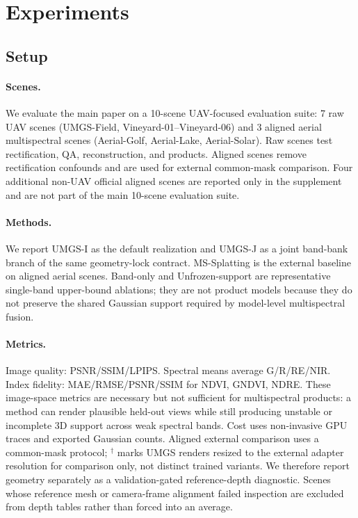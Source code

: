 ﻿\section{Experiments}

\subsection{Setup}

\paragraph{Scenes.}
We evaluate the main paper on a 10-scene UAV-focused evaluation suite: 7 raw UAV scenes (UMGS-Field, Vineyard-01--Vineyard-06) and 3 aligned aerial multispectral scenes (Aerial-Golf, Aerial-Lake, Aerial-Solar). Raw scenes test rectification, QA, reconstruction, and products. Aligned scenes remove rectification confounds and are used for external common-mask comparison. Four additional non-UAV official aligned scenes are reported only in the supplement and are not part of the main 10-scene evaluation suite.

\paragraph{Methods.}
We report UMGS-I as the default realization and UMGS-J as a joint band-bank branch of the same geometry-lock contract. MS-Splatting is the external baseline on aligned aerial scenes. Band-only and Unfrozen-support are representative single-band upper-bound ablations; they are not product models because they do not preserve the shared Gaussian support required by model-level multispectral fusion.

\paragraph{Metrics.}
Image quality: PSNR/SSIM/LPIPS. Spectral means average G/R/RE/NIR. Index fidelity: MAE/RMSE/PSNR/SSIM for NDVI, GNDVI, NDRE. These image-space metrics are necessary but not sufficient for multispectral products: a method can render plausible held-out views while still producing unstable or incomplete 3D support across weak spectral bands. Cost uses non-invasive GPU traces and exported Gaussian counts. Aligned external comparison uses a common-mask protocol; $^\dagger$ marks UMGS renders resized to the external adapter resolution for comparison only, not distinct trained variants. We therefore report geometry separately as a validation-gated reference-depth diagnostic. Scenes whose reference mesh or camera-frame alignment failed inspection are excluded from depth tables rather than forced into an average.

